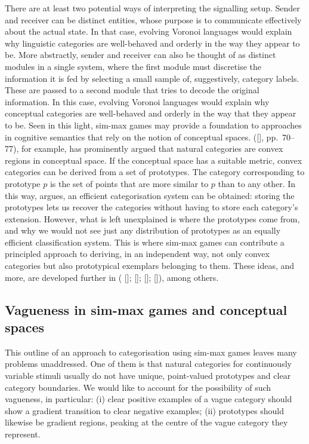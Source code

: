 \documentclass[12pt,english]{article}
\numberwithin{equation}{section}
\newcommand{\citetbjpspost}[2]{\citeauthor{#2} ([\citeyear{#2}], #1)}
\newcommand{\citealtbjps}[1]{\citeauthor{#1} [\citeyear{#1}]}
\begin{document}
There are at least two potential ways of interpreting the signalling setup.  Sender and
receiver can be distinct entities, whose purpose is to communicate effectively about the actual
state. In that case, evolving Voronoi languages would explain why linguistic categories are
well-behaved and orderly in the way they appear to be. More abstractly, sender and receiver can
also be thought of as distinct modules in a single system, where the first module must
discretise the information it is fed by selecting a small sample of, suggestively, category
labels. These are passed to a second module that tries to decode the original information. In
this case, evolving Voronoi languages would explain why conceptual categories are well-behaved
and orderly in the way that they appear to be.  Seen in this light, sim-max games may provide a
foundation to approaches in cognitive semantics that rely on the notion of conceptual spaces.
\citetbjpspost{pp.~70--77}{Gardenfors2000:Conceptual-Spac}, for example, has prominently argued
that natural categories are convex regions in conceptual space. If the conceptual space has a
suitable metric, convex categories can be derived from a set of prototypes. The category
corresponding to prototype $p$ is the set of points that are more similar to $p$ than to any
other. In this way, \citeauthor{Gardenfors2000:Conceptual-Spac} argues, an efficient
categorisation system can be obtained: storing the prototypes lets us recover the categories
without having to store each category's extension. However, what is left unexplained is where
the prototypes come from, and why we would not see just any distribution of prototypes as an
equally efficient classification system. This is where sim-max games can contribute a
principled approach to deriving, in an independent way, not only convex categories but also
prototypical exemplars belonging to them.  These ideas, and more, are developed further in
(\citealtbjps{Jager2007:The-Evolution-o};
\citealtbjps{JagerRooijvan-Rooij2007:Language-Struct};
\citealtbjps{JagerMetzger2011:Voronoi-Languag}; \citealtbjps{OConnor2014-OCOEPC}), among
others.

\subsection{Vagueness in sim-max games and conceptual spaces}

This outline of an approach to categorisation using sim-max games
leaves many problems unaddressed. One of them is that natural
categories for continuously variable stimuli usually do not have
unique, point-valued prototypes and clear category boundaries. We
would like to account for the possibility of such vagueness, in
particular: (i) clear positive examples of a vague category should
show a gradient transition to clear negative examples;
(ii) prototypes should likewise be gradient regions, peaking at the
centre of the vague category they represent.
\end{document}
